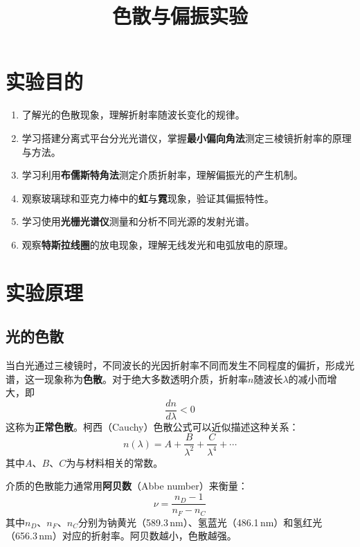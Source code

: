 \documentclass[UTF8]{article}
\title{色散与偏振实验}
\author{} %
\date{} %
\begin{document}
\maketitle

\section{实验目的}

\begin{enumerate}
    \item 了解光的色散现象，理解折射率随波长变化的规律。
    \item 学习搭建分离式平台分光光谱仪，掌握\textbf{最小偏向角法}测定三棱镜折射率的原理与方法。
    \item 学习利用\textbf{布儒斯特角法}测定介质折射率，理解偏振光的产生机制。
    \item 观察玻璃球和亚克力棒中的\textbf{虹}与\textbf{霓}现象，验证其偏振特性。
    \item 学习使用\textbf{光栅光谱仪}测量和分析不同光源的发射光谱。
    \item 观察\textbf{特斯拉线圈}的放电现象，理解无线发光和电弧放电的原理。
\end{enumerate}

\section{实验原理}

\subsection{光的色散}

当白光通过三棱镜时，不同波长的光因折射率不同而发生不同程度的偏折，形成光谱，这一现象称为\textbf{色散}。对于绝大多数透明介质，折射率$n$随波长$\lambda$的减小而增大，即
\[
\frac{dn}{d\lambda} < 0
\]
这称为\textbf{正常色散}。柯西（Cauchy）色散公式可以近似描述这种关系：
\[
n(\lambda) = A + \frac{B}{\lambda^2} + \frac{C}{\lambda^4} + \cdots
\]
其中$A$、$B$、$C$为与材料相关的常数。

介质的色散能力通常用\textbf{阿贝数}（Abbe number）来衡量：
\[
\nu = \frac{n_D - 1}{n_F - n_C}
\]
其中$n_D$、$n_F$、$n_C$分别为钠黄光（589.3\,nm）、氢蓝光（486.1\,nm）和氢红光（656.3\,nm）对应的折射率。阿贝数越小，色散越强。
\end{document}

